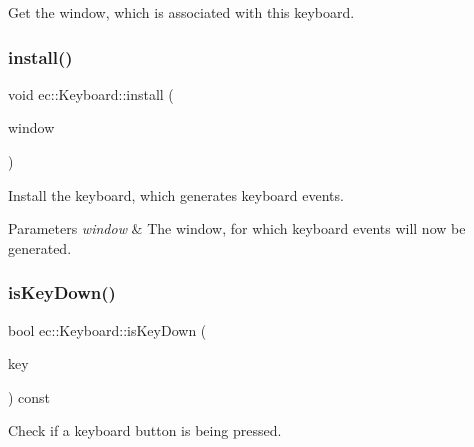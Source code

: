 Get the window, which is associated with this keyboard. 

\mbox{\label{classec_1_1_keyboard_af792a3b8226096510f6dfecc57697f8e}} 
\subsubsection{\texorpdfstring{install()}{install()}}
{\footnotesize\ttfamily void ec\+::\+Keyboard\+::install (\begin{DoxyParamCaption}\item[{\mbox{\hyperlink{classec_1_1_window}{Window}} $\ast$}]{window }\end{DoxyParamCaption})}



Install the keyboard, which generates keyboard events. 


\begin{DoxyParams}{Parameters}
{\em window} & The window, for which keyboard events will now be generated. \\
\hline
\end{DoxyParams}
\mbox{\label{classec_1_1_keyboard_a47779c0842584eb4337e1aa63e7d7a35}} 
\subsubsection{\texorpdfstring{is\+Key\+Down()}{isKeyDown()}}
{\footnotesize\ttfamily bool ec\+::\+Keyboard\+::is\+Key\+Down (\begin{DoxyParamCaption}\item[{\mbox{\hyperlink{classec_1_1_keyboard_a135ca08df15aebf8c93ce3cc76288a6e}{Keyboard\+::\+E\+C\+\_\+\+K\+E\+Y\+\_\+\+K\+E\+Y\+B\+O\+A\+RD}}}]{key }\end{DoxyParamCaption}) const}



Check if a keyboard button is being pressed. 

\mbox{\label{classec_1_1_keyboard_a0d260eb1df363be405af8a967aa8b5b6}} 
